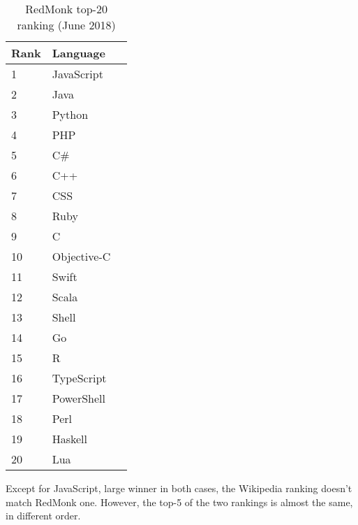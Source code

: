 \documentclass[a4paper]{article}
\def \hfillx {\hspace*{-\textwidth} \hfill}
\begin{document}
\begin{table}[H]
\begin{minipage}{0.5\textwidth}
		\end{minipage}
		\hfillx
		\begin{minipage}{0.5\textwidth}
			\centering

			\begin{tabular}{|l|l|l|}
				\hline
				\textbf{Rank}  & \textbf{Language} \\ \hline
				1              & JavaScript        \\ \hline
				2              & Java              \\ \hline
				3              & Python            \\ \hline
				4              & PHP               \\ \hline
				5              & C\#               \\ \hline
				6              & C++               \\ \hline
				7              & CSS               \\ \hline
				8              & Ruby              \\ \hline
				9              & C                 \\ \hline
				10             & Objective-C       \\ \hline
				11             & Swift             \\ \hline
				12             & Scala             \\ \hline
				13             & Shell             \\ \hline
				14             & Go                \\ \hline
				15             & R                 \\ \hline
				16             & TypeScript        \\ \hline
				17             & PowerShell        \\ \hline
				18             & Perl              \\ \hline
				19             & Haskell           \\ \hline
				20             & Lua               \\ \hline
			\end{tabular}
			\caption{RedMonk top-20 ranking (June 2018)}

		\end{minipage}
	\end{table}

	Except for JavaScript, large winner in both cases, the Wikipedia ranking doesn't match RedMonk one.
	However, the top-5 of the two rankings is almost the same, in different order.
\end{document}

